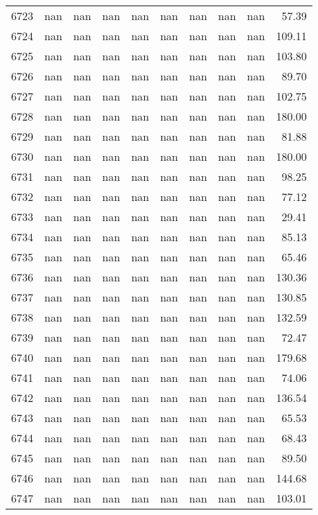 \begin{tabular}{lrrrrrrrrr}
6723 & nan & nan & nan & nan & nan & nan & nan & nan & 57.39 \\
6724 & nan & nan & nan & nan & nan & nan & nan & nan & 109.11 \\
6725 & nan & nan & nan & nan & nan & nan & nan & nan & 103.80 \\
6726 & nan & nan & nan & nan & nan & nan & nan & nan & 89.70 \\
6727 & nan & nan & nan & nan & nan & nan & nan & nan & 102.75 \\
6728 & nan & nan & nan & nan & nan & nan & nan & nan & 180.00 \\
6729 & nan & nan & nan & nan & nan & nan & nan & nan & 81.88 \\
6730 & nan & nan & nan & nan & nan & nan & nan & nan & 180.00 \\
6731 & nan & nan & nan & nan & nan & nan & nan & nan & 98.25 \\
6732 & nan & nan & nan & nan & nan & nan & nan & nan & 77.12 \\
6733 & nan & nan & nan & nan & nan & nan & nan & nan & 29.41 \\
6734 & nan & nan & nan & nan & nan & nan & nan & nan & 85.13 \\
6735 & nan & nan & nan & nan & nan & nan & nan & nan & 65.46 \\
6736 & nan & nan & nan & nan & nan & nan & nan & nan & 130.36 \\
6737 & nan & nan & nan & nan & nan & nan & nan & nan & 130.85 \\
6738 & nan & nan & nan & nan & nan & nan & nan & nan & 132.59 \\
6739 & nan & nan & nan & nan & nan & nan & nan & nan & 72.47 \\
6740 & nan & nan & nan & nan & nan & nan & nan & nan & 179.68 \\
6741 & nan & nan & nan & nan & nan & nan & nan & nan & 74.06 \\
6742 & nan & nan & nan & nan & nan & nan & nan & nan & 136.54 \\
6743 & nan & nan & nan & nan & nan & nan & nan & nan & 65.53 \\
6744 & nan & nan & nan & nan & nan & nan & nan & nan & 68.43 \\
6745 & nan & nan & nan & nan & nan & nan & nan & nan & 89.50 \\
6746 & nan & nan & nan & nan & nan & nan & nan & nan & 144.68 \\
6747 & nan & nan & nan & nan & nan & nan & nan & nan & 103.01 \\

\end{tabular}

